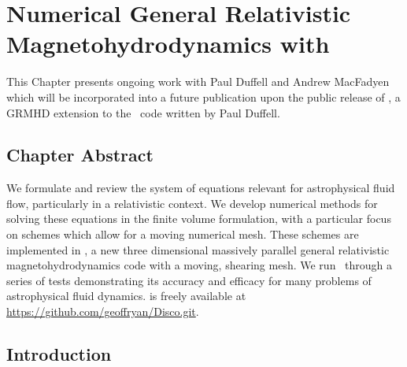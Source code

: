 \renewcommand{\chapid}{numerics}


\newcommand{\LL}{\mathcal{L}}
\newcommand{\UU}{\mathcal{U}}
\newcommand{\FF}{\mathcal{F}}
\newcommand{\VV}{\mathcal{V}}
\renewcommand{\AA}{\mathcal{A}}
\renewcommand{\SS}{\mathcal{S}}
\newcommand{\PP}{\mathcal{P}}
\newcommand{\UUU}{\mathrm{U}}
\newcommand{\FFF}{\mathrm{F}}
\newcommand{\SSS}{\mathrm{S}}
\newcommand{\dual}[1]{*\!\! #1}
\newcommand{\dualt}[1]{*\! #1}
\newcommand{\Risco}{R_{\rm ISCO}}
\newcommand{\sgn}{\mathrm{sgn}}
\newcommand{\CFL}{{\tt CFL}}
\newcommand{\ctop}{{\tt cons2prim}}


\chapter{Numerical General Relativistic Magnetohydrodynamics with \discogr {}}

This Chapter presents ongoing work with Paul Duffell and Andrew MacFadyen which will be incorporated into a future publication upon the public release of \grdisco, a GRMHD extension to the \disco\ code written by Paul Duffell.


\section{Chapter Abstract}

We formulate and review the system of equations relevant for astrophysical fluid flow, particularly in a relativistic context.  We develop numerical methods for solving these equations in the finite volume formulation, with a particular focus on schemes which allow for a moving numerical mesh.  These schemes are implemented in \grdisco, a new three dimensional massively parallel general relativistic magnetohydrodynamics code with a moving, shearing mesh.  We run \grdisco\ through a series of tests demonstrating its accuracy and efficacy for many problems of astrophysical fluid dynamics.  \grdisco is freely available at \url{https://github.com/geoffryan/Disco.git}.


\section{Introduction} 

